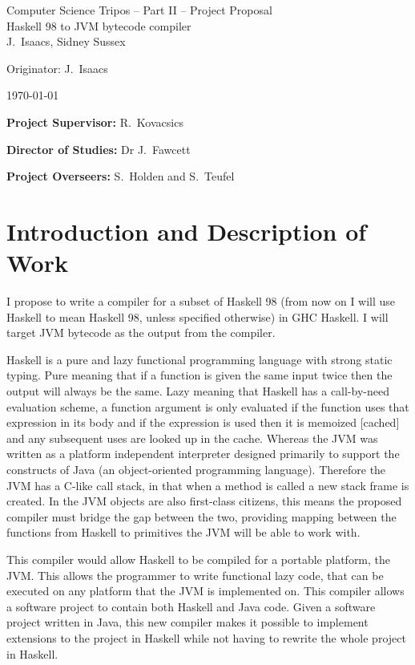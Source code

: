 \documentclass[12pt,a4paper,twoside]{article}
\begin{document}
\begin{center}
  \Large
  Computer Science Tripos -- Part II -- Project Proposal\\[4mm]
  \LARGE
  Haskell 98 to JVM bytecode compiler\\[4mm]

  \large
  J.~Isaacs, Sidney Sussex

  Originator: J.~Isaacs 

  \today
\end{center}

\vspace{5mm}

\textbf{Project Supervisor:} R.~Kovacsics

\textbf{Director of Studies:} Dr J.~Fawcett 

\textbf{Project Overseers:} S.~Holden and S.~Teufel



\section*{Introduction and Description of Work}

  I propose to write a compiler for a subset of Haskell 98 (from now on I will use Haskell to mean Haskell 98, unless specified otherwise)
  in GHC Haskell. I will target JVM bytecode as the output from the compiler.



  Haskell is a pure and lazy functional programming language with strong static typing. Pure meaning that
  if a function is given the same input twice then the output will always be the same. Lazy meaning that Haskell has a
  call-by-need evaluation scheme, a function argument is only evaluated if the function uses that expression in its body
  and if the expression is used then it is memoized [cached] and any subsequent uses are looked up in the cache.
  Whereas the JVM was written as a platform independent interpreter designed
  primarily to support the constructs of Java (an object-oriented programming language).
  Therefore the JVM has a C-like call stack, in that when a method is called a new stack frame is created. In the JVM objects are also first-class citizens, this means
  the proposed compiler must bridge the gap between the two, providing mapping between the functions from Haskell to primitives
  the JVM will be able to work with.

  This compiler would allow Haskell to be compiled for a portable platform, the JVM. This allows the programmer to
  write functional lazy code, that can be executed on any platform that the JVM is implemented on. This compiler allows a software project to contain both
  Haskell and Java code. Given a software project written in Java, this new compiler makes it possible to implement extensions to the project in Haskell
  while not having to rewrite the whole project in Haskell.
\end{document}
